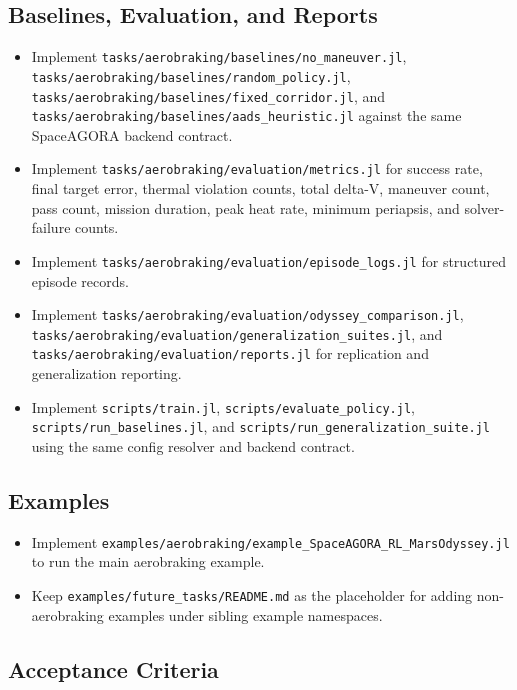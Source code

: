\documentclass[11pt]{article}
\begin{document}
\subsection{Baselines, Evaluation, and Reports}

\begin{itemize}
\item Implement \texttt{tasks/aerobraking/baselines/no\_maneuver.jl}, \texttt{tasks/aerobraking/baselines/random\_policy.jl}, \texttt{tasks/aerobraking/baselines/fixed\_corridor.jl}, and \texttt{tasks/aerobraking/baselines/aads\_heuristic.jl} against the same SpaceAGORA backend contract.
\item Implement \texttt{tasks/aerobraking/evaluation/metrics.jl} for success rate, final target error, thermal violation counts, total delta-V, maneuver count, pass count, mission duration, peak heat rate, minimum periapsis, and solver-failure counts.
\item Implement \texttt{tasks/aerobraking/evaluation/episode\_logs.jl} for structured episode records.
\item Implement \texttt{tasks/aerobraking/evaluation/odyssey\_comparison.jl}, \texttt{tasks/aerobraking/evaluation/generalization\_suites.jl}, and \texttt{tasks/aerobraking/evaluation/reports.jl} for replication and generalization reporting.
\item Implement \texttt{scripts/train.jl}, \texttt{scripts/evaluate\_policy.jl}, \texttt{scripts/run\_baselines.jl}, and \texttt{scripts/run\_generalization\_suite.jl} using the same config resolver and backend contract.
\end{itemize}


\subsection{Examples}

\begin{itemize}
\item Implement \texttt{examples/aerobraking/example\_SpaceAGORA\_RL\_MarsOdyssey.jl} to run the main aerobraking example.
\item Keep \texttt{examples/future\_tasks/README.md} as the placeholder for adding non-aerobraking examples under sibling example namespaces.
\end{itemize}


\subsection{Acceptance Criteria}
\end{document}

